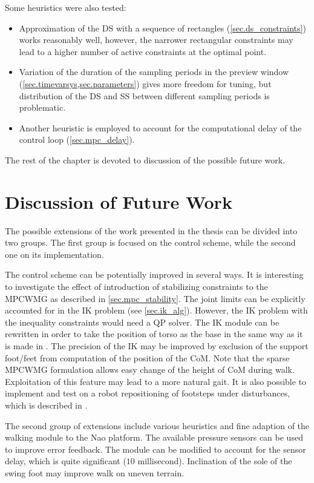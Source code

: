 Some heuristics were also tested:
\begin{itemize} 
    \item Approximation of the \ac{DS} with a sequence of rectangles 
        (\cref{sec.ds_constraints}) works reasonably well, however, the narrower 
        rectangular constraints may lead to a higher number of active constraints at 
        the optimal point. 
    \item Variation of the duration of the sampling periods in the preview window 
        (\cref{sec.timevarsys,sec.parameters}) gives more freedom for tuning, 
        but distribution of the \ac{DS} and \ac{SS} between different sampling 
        periods is problematic. 
    \item Another heuristic is employed to account for the computational delay of 
        the control loop (\cref{sec.mpc_delay}).
\end{itemize}

The rest of the chapter is devoted to discussion of the possible future work.



\section{Discussion of Future Work}
The possible extensions of the work presented in the thesis can be divided into
two groups. The first group is focused on the control scheme, while the second
one on its implementation.

The control scheme can be potentially improved in several ways. It is interesting
to investigate the effect of introduction of stabilizing constraints to the \ac{MPCWMG}
as described in \cref{sec.mpc_stability}. The joint limits can be explicitly accounted
for in the \ac{IK} problem (see \cref{sec.ik_alg}). However, the \ac{IK} problem with 
the inequality constraints would need a \ac{QP} solver. The \ac{IK} module
can be rewritten in order to take the position of torso as the base in the same way as
it is made in \cite{NaoWalk}. The precision of the \ac{IK} may be improved by exclusion 
of the support foot/feet from computation of the position of the \ac{CoM}. Note that the 
sparse \ac{MPCWMG} formulation allows easy change of the height of \ac{CoM} during 
walk. Exploitation of this feature may lead to a more natural gait. It is also possible 
to implement and test on a robot repositioning of footsteps under disturbances, which 
is described in \cite{dimitrov2011walking}.

The second group of extensions include various heuristics and fine adaption of the
walking module to the Nao platform. The available pressure sensors can be used to 
improve error feedback. The module can be modified to account for the sensor delay,
which is quite significant ($10$ millisecond). Inclination of the sole of the swing 
foot may improve walk on uneven terrain.

